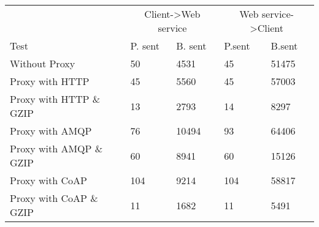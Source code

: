 \begin{tabularx}{\textwidth}{lXXXX}
\hline
\multicolumn{1}{l}{}                  & \multicolumn{2}{c}{Client->Web service}                           & \multicolumn{2}{c}{Web service->Client}                           \\
\multicolumn{1}{l}{Test} & \multicolumn{1}{l}{P. sent} & \multicolumn{1}{l}{B. sent} & \multicolumn{1}{l}{P.sent} & \multicolumn{1}{l}{B.sent} \\ \hline
Without Proxy                   & 50             & 4531           & 45             & 51475          \\
Proxy with HTTP                 & 45             & 5560           & 45             & 57003          \\
Proxy with HTTP \& GZIP         & 13             & 2793           & 14             & 8297           \\
Proxy with AMQP                 & 76             & 10494          & 93             & 64406          \\
Proxy with AMQP \& GZIP         & 60             & 8941           & 60             & 15126          \\
Proxy with CoAP                 & 104            & 9214           & 104            & 58817          \\
Proxy with CoAP \& GZIP         & 11             & 1682           & 11             & 5491           \\
\end{tabularx}
